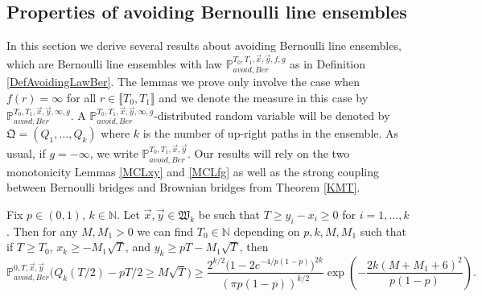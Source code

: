 \subsection{Properties of avoiding Bernoulli line ensembles}\label{Section3.3}  In this section we derive several results about avoiding Bernoulli line ensembles, which are Bernoulli line ensembles with law $\mathbb{P}_{avoid, Ber}^{T_0,T_1, \vec{x}, \vec{y}, f, g}$ as in Definition \ref{DefAvoidingLawBer}. The lemmas we prove only involve the case when $f(r) = \infty$ for all $r \in \llbracket T_0, T_1 \rrbracket$ and we denote the measure in this case by $\mathbb{P}_{avoid, Ber}^{T_0,T_1, \vec{x}, \vec{y}, \infty, g}$. A $\mathbb{P}_{avoid, Ber}^{T_0,T_1, \vec{x}, \vec{y}, \infty, g}$-distributed random variable will be denoted by $\mathfrak{Q} = (Q_1, \dots, Q_k)$ where $k$ is the number of up-right paths in the ensemble. As usual, if $g=-\infty$, we write $\mathbb{P}_{avoid, Ber}^{T_0,T_1, \vec{x}, \vec{y}}$. Our results will rely on the two monotonicity Lemmas \ref{MCLxy} and \ref{MCLfg} as well as the strong coupling between Bernoulli bridges and Brownian bridges from Theorem \ref{KMT}.


\begin{lemma}\label{prob19}
	Fix $p\in(0,1)$, $k\in\mathbb{N}$. Let $\vec{x},\vec{y}\in\mathfrak{W}_k$ be such that $T \geq y_i - x_i \geq 0$ for $i=1,\dots,k$. Then for any $M,M_1 > 0$ we can find $T_0\in\mathbb{N}$ depending on $p,k,M,M_1$ such that if $T\geq T_0$, $x_k \geq - M_1\sqrt{T}$, and $y_k \geq pT - M_1\sqrt{T}$, then
	\begin{equation}\label{19ineq}
	\mathbb{P}^{0,T,\vec{x},\vec{y}}_{avoid, Ber}\Big(Q_k(T/2) - pT/2 \geq M\sqrt{T}\Big) \geq \frac{2^{k/2}\big(1-2e^{-4/p(1-p)}\big)^{2k}}{(\pi p(1-p))^{k/2}}\exp\left(-\frac{2k(M+M_1+6)^2}{p(1-p)}\right).
	\end{equation}
\end{lemma}

